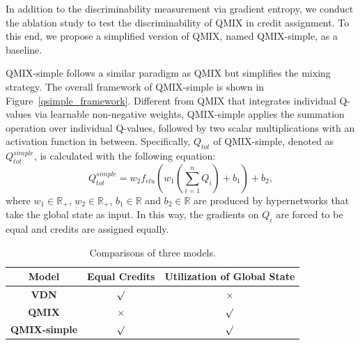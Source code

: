 In addition to the discriminability measurement via gradient entropy, we conduct the ablation study to test the discriminability of QMIX in credit assignment.
To this end, we propose a simplified version of QMIX, named QMIX-simple, as a baseline.

QMIX-simple follows a similar paradigm as QMIX but simplifies the mixing strategy.
The overall framework of QMIX-simple is shown in Figure~\ref{qsimple_framework}.
Different from QMIX that integrates individual Q-values via learnable non-negative weights, QMIX-simple applies the summation operation over individual Q-values, followed by two scalar multiplications with an activation function in between.
Specifically, $Q_{tot}$ of QMIX-simple, denoted as $Q_{tot}^{simple}$, is calculated with the following equation:
\begin{equation}
    \label{qmix simple}
    Q_{tot}^{simple}=w_2 f_{elu}(w_1 (\sum_{i=1}^n Q_i)+b_1)+b_2,
\end{equation}
where $w_1 \in \mathbb{R}_+$, $w_2 \in \mathbb{R}_+$, $b_1 \in \mathbb{R}$ and $b_2 \in \mathbb{R}$ are produced by hypernetworks that take the global state as input.
In this way, the gradients on $Q_i$ are forced to be equal and credits are assigned equally.

\begin{table}[htbp]
    \centering
    \resizebox{0.6\linewidth}{!} {
    \begin{tabular}{c|c|c}
        \hline
        Model & Equal Credits & Utilization of Global State \\
        \hline
        \textbf{VDN} & $\surd$ & $\times$ \\ 
        \textbf{QMIX} & $\times$ & $\surd$ \\ 
        \textbf{QMIX-simple} & $\surd$ & $\surd$ \\ 
        \hline
    \end{tabular}
    }
    \caption{Comparisons of three models.}
    \label{tab:model_diff}
\end{table}

